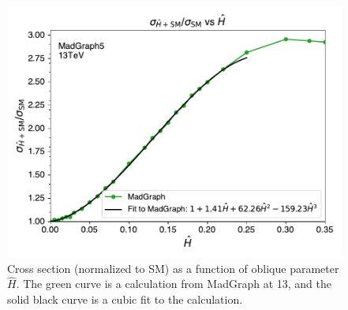 \begin{figure}[!htbp]
    \centering
    \includegraphics[width=0.75\linewidth]{figs/ftan/higgs_oblique.pdf}
    \caption{
        Cross section (normalized to SM) as a function of oblique parameter $\hat{H}$.
        The green curve is a calculation from MadGraph at 13\TeV, and
        the solid black curve is a cubic fit to the calculation.
    }
    \label{fig:higgs_oblique_madgraph}
\end{figure}
